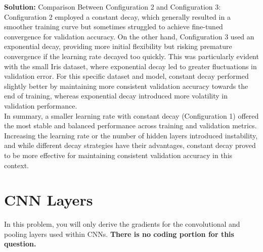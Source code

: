 \documentclass{article}
\newcommand{\Question}[1]{\Large \section{ #1 } \normalsize}
\newenvironment{solution}{\color{blue} \smallskip \textbf{Solution:}}{}
\begin{document}
\begin{solution}
Comparison Between Configuration 2 and Configuration 3:
Configuration 2 employed a constant decay, which generally resulted in a smoother training curve but sometimes struggled to achieve fine-tuned convergence for validation accuracy. On the other hand, Configuration 3 used an exponential decay, providing more initial flexibility but risking premature convergence if the learning rate decayed too quickly. This was particularly evident with the small Iris dataset, where exponential decay led to greater fluctuations in validation error. For this specific dataset and model, constant decay performed slightly better by maintaining more consistent validation accuracy towards the end of training, whereas exponential decay introduced more volatility in validation performance.\\

In summary, a smaller learning rate with constant decay (Configuration 1) offered the most stable and balanced performance across training and validation metrics. Increasing the learning rate or the number of hidden layers introduced instability, and while different decay strategies have their advantages, constant decay proved to be more effective for maintaining consistent validation accuracy in this context.





\end{solution}

\newpage
\Question{CNN Layers}
In this problem, you will only derive the gradients for the convolutional and pooling layers used within CNNs. 
\textbf{There is no coding portion for this question.}
\end{document}
